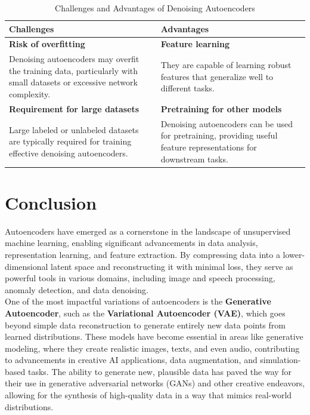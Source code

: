 \documentclass[a4paper,12pt]{article}
\begin{document}
    \begin{table}[h!]
    \centering
    \renewcommand{\arraystretch}{1.6} %
    \begin{tabular}{|p{6cm}|p{6cm}|}
        \hline
        \textbf{Challenges} & \textbf{Advantages} \\ \hline
        \textbf{Risk of overfitting} & \textbf{Feature learning} \\
        Denoising autoencoders may overfit the training data, particularly with small datasets or excessive network complexity. & They are capable of learning robust features that generalize well to different tasks. \\ \hline
        
        \textbf{Requirement for large datasets} & \textbf{Pretraining for other models} \\
        Large labeled or unlabeled datasets are typically required for training effective denoising autoencoders. & Denoising autoencoders can be used for pretraining, providing useful feature representations for downstream tasks. \\ \hline
    \end{tabular}
    \caption{Challenges and Advantages of Denoising Autoencoders}
    \label{tab:challenges_advantages_part2}
    \end{table}
    

\section{Conclusion}

\justify 

Autoencoders have emerged as a cornerstone in the landscape of unsupervised machine learning, enabling significant advancements in data analysis, representation learning, and feature extraction. By compressing data into a lower-dimensional latent space and reconstructing it with minimal loss, they serve as powerful tools in various domains, including image and speech processing, anomaly detection, and data denoising. \\[1em]

One of the most impactful variations of autoencoders is the \textbf{Generative Autoencoder}, such as the \textbf{Variational Autoencoder (VAE)}, which goes beyond simple data reconstruction to generate entirely new data points from learned distributions. These models have become essential in areas like generative modeling, where they create realistic images, texts, and even audio, contributing to advancements in creative AI applications, data augmentation, and simulation-based tasks. The ability to generate new, plausible data has paved the way for their use in generative adversarial networks (GANs) and other creative endeavors, allowing for the synthesis of high-quality data in a way that mimics real-world distributions. \\[1em]
\end{document}
